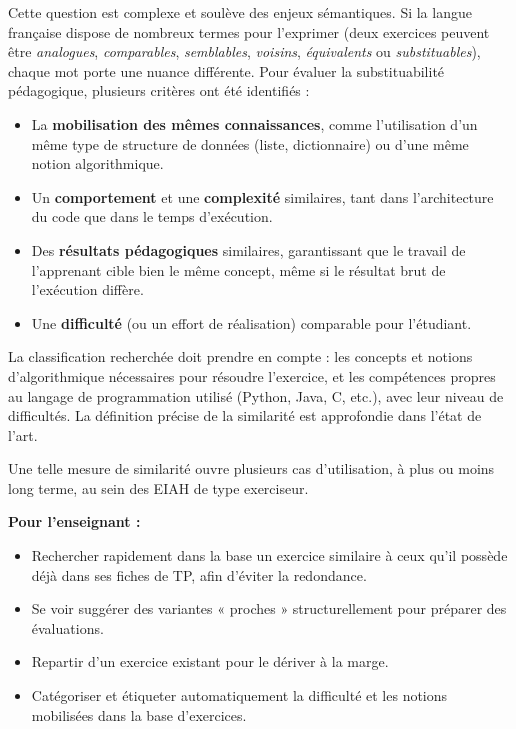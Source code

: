 \documentclass[12pt,a4paper,oneside]{report}
\begin{document}
Cette question est complexe et soulève des enjeux sémantiques. Si la langue française dispose de nombreux termes pour l'exprimer (deux exercices peuvent être \emph{analogues}, \emph{comparables}, \emph{semblables}, \emph{voisins}, \emph{équivalents} ou \emph{substituables}), chaque mot porte une nuance différente. Pour évaluer la substituabilité pédagogique, plusieurs critères ont été identifiés :
\begin{itemize}
    \item La \textbf{mobilisation des mêmes connaissances}, comme l'utilisation d'un même type de structure de données (liste, dictionnaire) ou d'une même notion algorithmique.
    \item Un \textbf{comportement} et une \textbf{complexité} similaires, tant dans l'architecture du code que dans le temps d'exécution.
    \item Des \textbf{résultats pédagogiques} similaires, garantissant que le travail de l'apprenant cible bien le même concept, même si le résultat brut de l'exécution diffère.
    \item Une \textbf{difficulté} (ou un effort de réalisation) comparable pour l'étudiant.
\end{itemize}

La classification recherchée doit prendre en
compte  : les concepts et notions d'algorithmique
nécessaires pour résoudre l'exercice, et les compétences propres au langage
de programmation utilisé (Python, Java, C, etc.), avec leur niveau de difficultés. La définition précise de la similarité est approfondie dans
l'état de l'art.
\vspace{3.2cm}

Une telle mesure de similarité ouvre plusieurs cas d'utilisation, à plus ou
moins long terme, au sein des EIAH de type exerciseur.
\vspace{0.4cm}

\textbf{Pour l'enseignant :}
\begin{itemize}
    \item Rechercher rapidement dans la base un exercice similaire à ceux qu'il possède déjà dans ses fiches de TP, afin d'éviter la redondance.
    \item Se voir suggérer des variantes « proches » structurellement pour préparer des évaluations.
    \item Repartir d'un exercice existant pour le dériver à la marge.
    \item Catégoriser et étiqueter automatiquement la difficulté et les notions mobilisées dans la base d'exercices.
\end{itemize}
\vspace{0.4cm}
\end{document}
